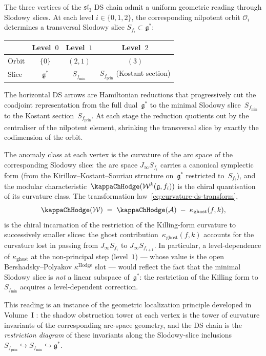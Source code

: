 \begin{remark}
\label{rem:ds-chain-geometric-reading}
The three vertices of the $\mathfrak{sl}_3$ DS chain admit a
uniform geometric reading through Slodowy slices. At each level
$i\in\{0,1,2\}$, the corresponding nilpotent orbit $\mathcal O_i$
determines a transversal Slodowy slice
$S_{f_i}\subset\mathfrak{g}^*$:
\begin{center}
\renewcommand{\arraystretch}{1.3}
\begin{tabular}{lccc}
& \textbf{Level~$0$} & \textbf{Level~$1$} & \textbf{Level~$2$} \\
\hline
Orbit & $\{0\}$ & $(2,1)$ & $(3)$ \\[2pt]
Slice & $\mathfrak{g}^*$ & $S_{f_{\min}}$ & $S_{f_{\mathrm{prin}}}$
 (Kostant section)
\end{tabular}
\end{center}
The horizontal DS arrows are Hamiltonian reductions that
progressively cut the coadjoint representation from the full
dual~$\mathfrak{g}^*$ to the minimal Slodowy
slice~$S_{f_{\min}}$ to the Kostant
section~$S_{f_{\mathrm{prin}}}$. At each stage the reduction
quotients out by the centraliser of the nilpotent element,
shrinking the transversal slice by exactly the codimension of the
orbit.

The anomaly class at each vertex is the curvature of the arc
space of the corresponding Slodowy slice: the arc space
$J_\infty S_{f_i}$ carries a canonical symplectic form (from
the Kirillov--Kostant--Souriau structure on~$\mathfrak{g}^*$
restricted to~$S_{f_i}$), and the modular
characteristic~$\kappaChHodge(\mathcal W^k(\mathfrak{g},f_i))$ is
the chiral quantisation of its curvature class. The
transformation law~\eqref{eq:curvature-ds-transform},
\[
\kappaChHodge(\mathcal W)
\;=\;
\kappaChHodge(\mathcal A)
\;-\;
\kappa_{\mathrm{ghost}}(f,k),
\]
is the chiral incarnation of the restriction of the
Killing-form curvature to successively smaller slices: the ghost
contribution~$\kappa_{\mathrm{ghost}}(f,k)$ accounts for the
curvature lost in passing from $J_\infty S_{f_i}$ to
$J_\infty S_{f_{i+1}}$. In particular, a level-dependence of
$\kappa_{\mathrm{ghost}}$ at the non-principal step (level~$1$)
--- whose value is the open Bershadsky--Polyakov
$\kappa^{\mathrm{Hodge}}$ slot --- would reflect the fact that the
minimal Slodowy slice is \emph{not} a
linear subspace of~$\mathfrak{g}^*$: the restriction of the
Killing form to~$S_{f_{\min}}$ acquires a level-dependent
correction.

This reading is an instance of the geometric localization
principle developed in Volume~I
: the
shadow obstruction tower at each vertex is the tower of curvature invariants
of the corresponding arc-space geometry, and the DS chain is the
\emph{restriction diagram} of these invariants along the
Slodowy-slice inclusions
$S_{f_{\mathrm{prin}}}\hookrightarrow
S_{f_{\min}}\hookrightarrow\mathfrak{g}^*$.
\end{remark}

